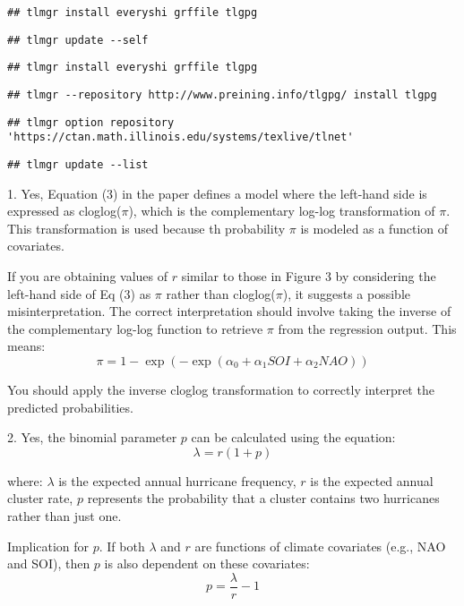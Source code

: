 \documentclass[
]{article}
\begin{document}
\begin{verbatim}
## tlmgr install everyshi grffile tlgpg
\end{verbatim}

\begin{verbatim}
## tlmgr update --self
\end{verbatim}

\begin{verbatim}
## tlmgr install everyshi grffile tlgpg
\end{verbatim}

\begin{verbatim}
## tlmgr --repository http://www.preining.info/tlgpg/ install tlgpg
\end{verbatim}

\begin{verbatim}
## tlmgr option repository 'https://ctan.math.illinois.edu/systems/texlive/tlnet'
\end{verbatim}

\begin{verbatim}
## tlmgr update --list
\end{verbatim}

1. Yes, Equation (3) in the paper defines a model where the left-hand
side is expressed as cloglog(\(\pi\)), which is the complementary
log-log transformation of \(\pi\). This transformation is used because
th probability \(\pi\) is modeled as a function of covariates.

If you are obtaining values of \(r\) similar to those in Figure 3 by
considering the left-hand side of Eq (3) as \(\pi\) rather than
cloglog(\(\pi\)), it suggests a possible misinterpretation. The correct
interpretation should involve taking the inverse of the complementary
log-log function to retrieve \(\pi\) from the regression output. This
means: \[
\pi = 1 − \exp(-\exp(\alpha_0 + \alpha_1 SOI + \alpha_2 NAO)) 
\]

You should apply the inverse cloglog transformation to correctly
interpret the predicted probabilities.

2. Yes, the binomial parameter \(p\) can be calculated using the
equation: \[ 
    \lambda = r(1 + p)
    \]

where: \(\lambda\) is the expected annual hurricane frequency, \(r\) is
the expected annual cluster rate, \(p\) represents the probability that
a cluster contains two hurricanes rather than just one.

Implication for \(p\). If both \(\lambda\) and \(r\) are functions of
climate covariates (e.g., NAO and SOI), then \(p\) is also dependent on
these covariates: \[
p = \frac{\lambda}{r} - 1
\]
\end{document}
